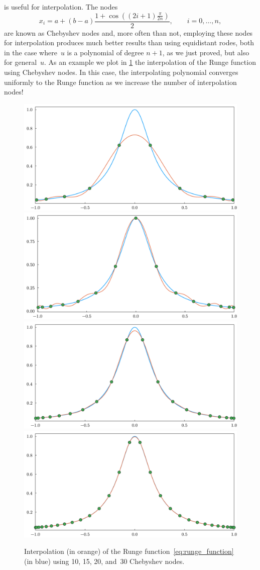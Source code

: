  is useful for interpolation.
The nodes
\begin{equation}
    x_i = a + (b-a) \frac{1 + \cos \left( (2i + 1) \frac{\pi}{2 n} \right)}{2}, \qquad i = 0, \dotsc, n,
\end{equation}
are known as Chebyshev nodes and,
more often than not, employing these nodes for interpolation produces much better results than using equidistant rodes,
both in the case where~$u$ is a polynomial of degree $n+1$,
as we just proved,
but also for general~$u$.
As an example we plot in \cref{fig:cheb_runge} the interpolation of the Runge function using Chebyshev nodes.
In this case, the interpolating polynomial converges uniformly to the Runge function as we increase the number of interpolation nodes!
\begin{figure}[ht]
    \centering
    \includegraphics[width=0.49\linewidth]{figures/interpolation_cheb_runge_10.pdf}
    \includegraphics[width=0.49\linewidth]{figures/interpolation_cheb_runge_15.pdf}
    \includegraphics[width=0.49\linewidth]{figures/interpolation_cheb_runge_20.pdf}
    \includegraphics[width=0.49\linewidth]{figures/interpolation_cheb_runge_30.pdf}
    \caption{Interpolation (in orange) of the Runge function~\eqref{eq:runge_function} (in blue) using 10, 15, 20, and~30 Chebyshev nodes.}%
    \label{fig:cheb_runge}
\end{figure}

